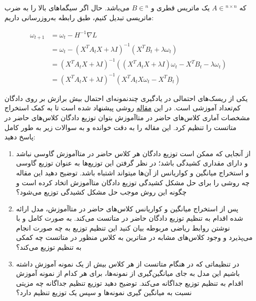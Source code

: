 \documentclass{article}
\begin{document}
\begin{enumerate}
	که
	$A \in {^{n \times n}}$
	یک ماتریس قطری
	و
	$B \in {^n}$
	می‌باشد. 
	حال اگر سیگماهای بالا را به ضرب ماتریسی تبدیل کنیم،‌ طبق رابطه به‌روزرسانی داریم:
	
	$$
	\begin{aligned}
		{\omega _{t + 1}} & = {\omega _t} - {H^{ - 1}}\nabla L\\
		& = {\omega _t} - {\left( {{X^T}{A_t}X + \lambda I} \right)^{ - 1}}\left( {{X^T}{B_t} + \lambda {\omega _t}} \right)\\
		&‌= {\left( {{X^T}{A_t}X + \lambda I} \right)^{ - 1}}\left( {\left( {{X^T}{A_t}X + \lambda I} \right){\omega _t} - {X^T}{B_t} - \lambda {\omega _t}} \right)\\
		&‌= {\left( {{X^T}{A_t}X + \lambda I} \right)^{ - 1}}\left( {{X^T}{A_t}X{\omega _t} - {X^T}{B_t}} \right)
	\end{aligned}
	$$
	
	
\end{enumerate}


یکی از ریسک‌های احتمالی در یادگیری چندنمونه‌ای احتمال بیش برازش بر روی دادگان کم‌تعداد آموزشی است. در این
\href{https://arxiv.org/abs/2101.06395}{مقاله}
روشی پیشنهاد شده است تا به کمک استخراج مشخصات آماری کلاس‌های حاضر در متاآموزش بتوان توزیع دادگان کلاس‌های حاضر در متاتست را تنظیم کرد. این مقاله را به دقت خوانده و به سوالات زیر به طور کامل پاسخ دهید:

\begin{enumerate}

\item
از آنجایی که ممکن است توزیع دادگان هر کلاس حاضر در متاآموزش گاوسی نباشد و دارای مقداری کشیدگی باشد؛ در نظر گرفتن این توزیع‌ها به عنوان توزیع گاوسی و استخراج میانگین و کواریانس از آن‌ها میتواند اشتباه باشد. توضیح دهید این مقاله چه روشی را برای حل مشکل کشیدگی توزیع دادگان متاآموزش اتخاد کرده است و چگونه این روش موجب حل مشکل کشیدگی توزیع می‌شود؟

\item
پس از استخراج میانگین و کواریانس کلاس‌های حاضر در متاآموزش، مدل ارائه شده اقدام به تنظیم توزیع دادگان حاضر در متاتست می‌کند. به صورت کامل و با نوشتن روابط ریاضی مربوطه بیان کنید این تنظیم توزیع به چه صورت انجام می‌پذیرد و وجود کلاس‌های مشابه در متاترین به کلاس منظور در متاتست چه کمکی به تنظیم توزیع می‌کند؟

\item
در تنظیماتی که در هنگام متاتست از هر کلاس بیش از یک نمونه آموزش داشته باشیم این مدل به جای میانگین‌گیری از نمونه‌ها، برای هر کدام از 
نمونه آموزش اقدام به تنظیم توزیع جداگانه می‌کند. توضیح دهید توزیع تنظیم جداگانه چه مزیتی نسبت به میانگین گیری نمونه‌ها و سپس یک توزیع تنظیم دارد؟

\end{enumerate}
\end{document}
